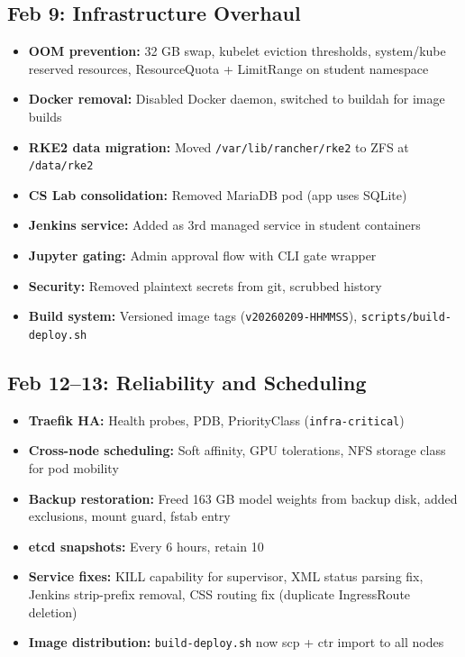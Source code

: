 \documentclass[11pt,a4paper]{article}
\begin{document}
\subsection{Feb 9: Infrastructure Overhaul}
\begin{itemize}[nosep]
    \item \textbf{OOM prevention:} 32 GB swap, kubelet eviction thresholds, system/kube reserved resources, ResourceQuota + LimitRange on student namespace
    \item \textbf{Docker removal:} Disabled Docker daemon, switched to buildah for image builds
    \item \textbf{RKE2 data migration:} Moved \texttt{/var/lib/rancher/rke2} to ZFS at \texttt{/data/rke2}
    \item \textbf{CS Lab consolidation:} Removed MariaDB pod (app uses SQLite)
    \item \textbf{Jenkins service:} Added as 3rd managed service in student containers
    \item \textbf{Jupyter gating:} Admin approval flow with CLI gate wrapper
    \item \textbf{Security:} Removed plaintext secrets from git, scrubbed history
    \item \textbf{Build system:} Versioned image tags (\texttt{v20260209-HHMMSS}), \texttt{scripts/build-deploy.sh}
\end{itemize}

\subsection{Feb 12--13: Reliability and Scheduling}
\begin{itemize}[nosep]
    \item \textbf{Traefik HA:} Health probes, PDB, PriorityClass (\texttt{infra-critical})
    \item \textbf{Cross-node scheduling:} Soft affinity, GPU tolerations, NFS storage class for pod mobility
    \item \textbf{Backup restoration:} Freed 163 GB model weights from backup disk, added exclusions, mount guard, fstab entry
    \item \textbf{etcd snapshots:} Every 6 hours, retain 10
    \item \textbf{Service fixes:} KILL capability for supervisor, XML status parsing fix, Jenkins strip-prefix removal, CSS routing fix (duplicate IngressRoute deletion)
    \item \textbf{Image distribution:} \texttt{build-deploy.sh} now scp + ctr import to all nodes
\end{itemize}
\end{document}

